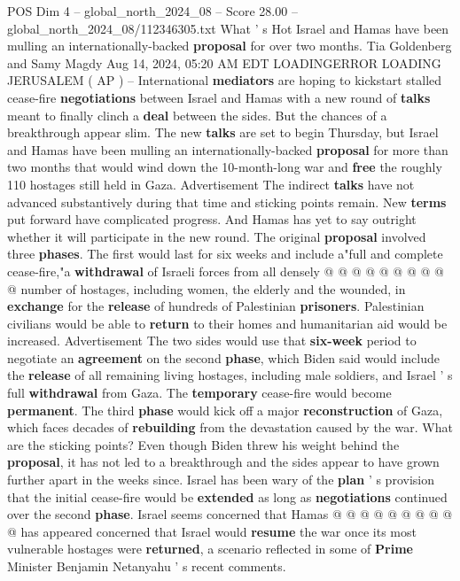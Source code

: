 \begin{textsample}{POS Dim 4 – global\_north\_2024\_08 – Score 28.00 – global\_north\_2024\_08/112346305.txt}  \label{ex:f4_pos_151}
What ' s Hot Israel and Hamas have been mulling an internationally-backed \textbf{proposal} for over two months.
Tia Goldenberg and Samy Magdy Aug 14, 2024, 05:20 AM EDT LOADINGERROR LOADING JERUSALEM ( AP ) -- International \textbf{mediators} are hoping to kickstart stalled cease-fire \textbf{negotiations} between Israel and Hamas with a new round of \textbf{talks} meant to finally clinch a \textbf{deal} between the sides.
But the chances of a breakthrough appear slim.
The new \textbf{talks} are set to begin Thursday, but Israel and Hamas have been mulling an internationally-backed \textbf{proposal} for more than two months that would wind down the 10-month-long war and \textbf{free} the roughly 110 hostages still held in Gaza.
Advertisement The indirect \textbf{talks} have not advanced substantively during that time and sticking points remain.
New \textbf{terms} put forward have complicated progress.
And Hamas has yet to say outright whether it will participate in the new round.
The original \textbf{proposal} involved three \textbf{phases}.
The first would last for six weeks and include a"full and complete cease-fire,"a \textbf{withdrawal} of Israeli forces from all densely @ @ @ @ @ @ @ @ @ @ number of hostages, including women, the elderly and the wounded, in \textbf{exchange} for the \textbf{release} of hundreds of Palestinian \textbf{prisoners}.
Palestinian civilians would be able to \textbf{return} to their homes and humanitarian aid would be increased.
Advertisement The two sides would use that \textbf{six-week} period to negotiate an \textbf{agreement} on the second \textbf{phase}, which Biden said would include the \textbf{release} of all remaining living hostages, including male soldiers, and Israel ' s full \textbf{withdrawal} from Gaza.
The \textbf{temporary} cease-fire would become \textbf{permanent}.
The third \textbf{phase} would kick off a major \textbf{reconstruction} of Gaza, which faces decades of \textbf{rebuilding} from the devastation caused by the war.
What are the sticking points?
Even though Biden threw his weight behind the \textbf{proposal}, it has not led to a breakthrough and the sides appear to have grown further apart in the weeks since.
Israel has been wary of the \textbf{plan} ' s provision that the initial cease-fire would be \textbf{extended} as long as \textbf{negotiations} continued over the second \textbf{phase}.
Israel seems concerned that Hamas @ @ @ @ @ @ @ @ @ @ has appeared concerned that Israel would \textbf{resume} the war once its most vulnerable hostages were \textbf{returned}, a scenario reflected in some of \textbf{Prime} Minister Benjamin Netanyahu ' s recent comments.

\end{textsample}
